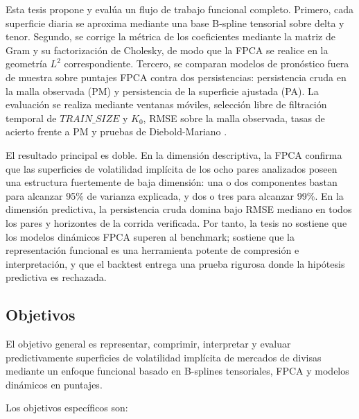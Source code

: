 \documentclass[12pt,a4paper]{article}
\newcommand{\SVIs}{superficies de volatilidad implícita}
\begin{document}
Esta tesis propone y evalúa un flujo de trabajo funcional completo. Primero, cada superficie diaria se aproxima mediante una base B-spline tensorial sobre delta y tenor. Segundo, se corrige la métrica de los coeficientes mediante la matriz de Gram y su factorización de Cholesky, de modo que la FPCA se realice en la geometría \(L^2\) correspondiente. Tercero, se comparan modelos de pronóstico fuera de muestra sobre puntajes FPCA contra dos persistencias: persistencia cruda en la malla observada (PM) y persistencia de la superficie ajustada (PA). La evaluación se realiza mediante ventanas móviles, selección libre de filtración temporal de \(TRAIN\_SIZE\) y \(K_0\), RMSE sobre la malla observada, tasas de acierto frente a PM y pruebas de Diebold-Mariano \cite{DieboldMariano1995}.

El resultado principal es doble. En la dimensión descriptiva, la FPCA confirma que las \SVIs{} de los ocho pares analizados poseen una estructura fuertemente de baja dimensión: una o dos componentes bastan para alcanzar 95\% de varianza explicada, y dos o tres para alcanzar 99\%. En la dimensión predictiva, la persistencia cruda domina bajo RMSE mediano en todos los pares y horizontes de la corrida verificada. Por tanto, la tesis no sostiene que los modelos dinámicos FPCA superen al benchmark; sostiene que la representación funcional es una herramienta potente de compresión e interpretación, y que el backtest entrega una prueba rigurosa donde la hipótesis predictiva es rechazada.

\subsection{Objetivos}

El objetivo general es representar, comprimir, interpretar y evaluar predictivamente \SVIs{} de mercados de divisas mediante un enfoque funcional basado en B-splines tensoriales, FPCA y modelos dinámicos en puntajes.

Los objetivos específicos son:
\end{document}
